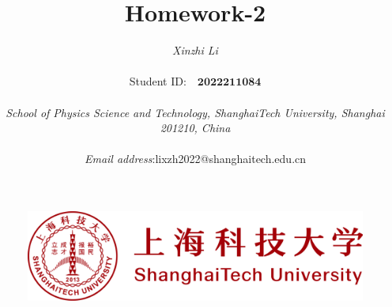 \documentclass[a4paper,11pt]{article}
\begin{document}
\pagestyle{fancy}
\title{\textbf{\Huge{Homework-2}}}

\author{\textit{Xinzhi Li} \\\quad\\Student ID:~~$\boldsymbol{2022211084}$\\\quad\\ \textit{School of Physics Science and Technology, ShanghaiTech University, Shanghai 201210, China}\\\quad \\ \textit{Email address}:\quad lixzh2022@shanghaitech.edu.cn}


\begin{figure}[t]
\centering
\includegraphics[width=1\columnwidth]{logo/row.png}
\end{figure}

\maketitle\thispagestyle{empty}
\newpage
\setcounter{page}{1}
\end{document}
